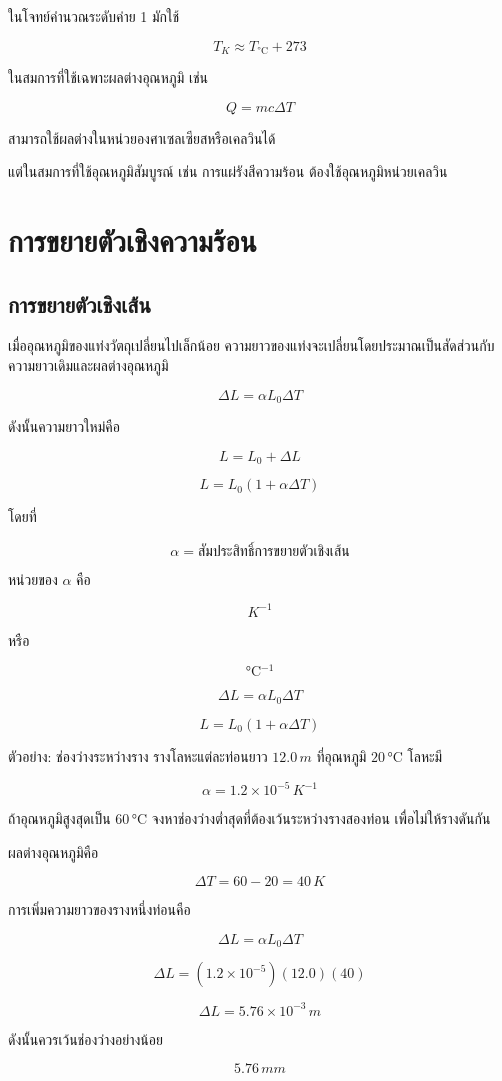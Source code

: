 ในโจทย์คำนวณระดับค่าย 1 มักใช้

\[
T_{\si{K}}\approx T_{\si{\degreeCelsius}}+273
\]

\begin{tcolorbox}[title=ข้อควรระวัง]
ในสมการที่ใช้เฉพาะผลต่างอุณหภูมิ เช่น

\[
Q=mc\Delta T
\]

สามารถใช้ผลต่างในหน่วยองศาเซลเซียสหรือเคลวินได้

แต่ในสมการที่ใช้อุณหภูมิสัมบูรณ์ เช่น การแผ่รังสีความร้อน ต้องใช้อุณหภูมิหน่วยเคลวิน
\end{tcolorbox}

\section{การขยายตัวเชิงความร้อน}

\subsection{การขยายตัวเชิงเส้น}

เมื่ออุณหภูมิของแท่งวัตถุเปลี่ยนไปเล็กน้อย ความยาวของแท่งจะเปลี่ยนโดยประมาณเป็นสัดส่วนกับความยาวเดิมและผลต่างอุณหภูมิ

\[
\Delta L=\alpha L_0\Delta T
\]

ดังนั้นความยาวใหม่คือ

\[
L=L_0+\Delta L
\]

\[
L=L_0(1+\alpha\Delta T)
\]

โดยที่

\[
\alpha=\text{สัมประสิทธิ์การขยายตัวเชิงเส้น}
\]

หน่วยของ $\alpha$ คือ

\[
\si{K^{-1}}
\]

หรือ

\[
\si{\degreeCelsius^{-1}}
\]

\begin{tcolorbox}[title=การขยายตัวเชิงเส้น]
\[
\boxed{\Delta L=\alpha L_0\Delta T}
\]

\[
\boxed{L=L_0(1+\alpha\Delta T)}
\]
\end{tcolorbox}

\begin{examplebox}{ตัวอย่าง: ช่องว่างระหว่างราง}
รางโลหะแต่ละท่อนยาว $12.0\,\si{m}$ ที่อุณหภูมิ $20\,\si{\degreeCelsius}$ โลหะมี

\[
\alpha=1.2\times 10^{-5}\,\si{K^{-1}}
\]

ถ้าอุณหภูมิสูงสุดเป็น $60\,\si{\degreeCelsius}$ จงหาช่องว่างต่ำสุดที่ต้องเว้นระหว่างรางสองท่อน เพื่อไม่ให้รางดันกัน

ผลต่างอุณหภูมิคือ

\[
\Delta T=60-20=40\,\si{K}
\]

การเพิ่มความยาวของรางหนึ่งท่อนคือ

\[
\Delta L=\alpha L_0\Delta T
\]

\[
\Delta L=(1.2\times 10^{-5})(12.0)(40)
\]

\[
\Delta L=5.76\times 10^{-3}\,\si{m}
\]

ดังนั้นควรเว้นช่องว่างอย่างน้อย

\[
\boxed{5.76\,\si{mm}}
\]
\end{examplebox}

